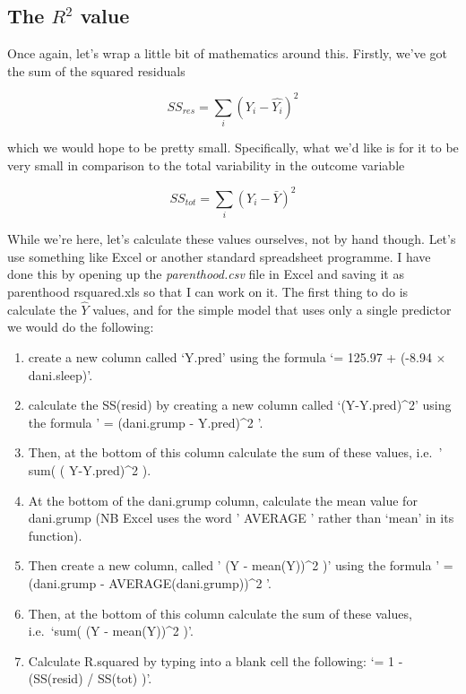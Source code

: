\documentclass[
  a4paper,
]{book}
\providecommand{\tightlist}{%
  \setlength{\itemsep}{0pt}\setlength{\parskip}{0pt}}\usepackage{longtable,booktabs,array}
\begin{document}
\hypertarget{sec-The-R2-value}{%
\subsection{\texorpdfstring{The \(R^2\)
value}{The R\^{}2 value}}\label{sec-The-R2-value}}

Once again, let's wrap a little bit of mathematics around this. Firstly,
we've got the sum of the squared residuals

\[SS_{res}=\sum_i (Y_i-\hat{Y_i})^2\]

which we would hope to be pretty small. Specifically, what we'd like is
for it to be very small in comparison to the total variability in the
outcome variable

\[SS_{tot}=\sum_i(Y_i-\bar{Y})^2\]

While we're here, let's calculate these values ourselves, not by hand
though. Let's use something like Excel or another standard spreadsheet
programme. I have done this by opening up the \emph{parenthood.csv} file
in Excel and saving it as parenthood rsquared.xls so that I can work on
it. The first thing to do is calculate the \(\hat{Y}\) values, and for
the simple model that uses only a single predictor we would do the
following:

\begin{enumerate}
\def\labelenumi{\arabic{enumi}.}
\tightlist
\item
  create a new column called `Y.pred' using the formula `= 125.97 +
  (-8.94 \(\times\) dani.sleep)'.
\item
  calculate the SS(resid) by creating a new column called
  `(Y-Y.pred)\^{}2' using the formula ' = (dani.grump - Y.pred)\^{}2 '.
\item
  Then, at the bottom of this column calculate the sum of these values,
  i.e.~' sum( ( Y-Y.pred)\^{}2 ).
\item
  At the bottom of the dani.grump column, calculate the mean value for
  dani.grump (NB Excel uses the word ' AVERAGE ' rather than `mean' in
  its function).
\item
  Then create a new column, called ' (Y - mean(Y))\^{}2 )' using the
  formula ' = (dani.grump - AVERAGE(dani.grump))\^{}2 '.
\item
  Then, at the bottom of this column calculate the sum of these values,
  i.e.~`sum( (Y - mean(Y))\^{}2 )'.
\item
  Calculate R.squared by typing into a blank cell the following: `= 1 -
  (SS(resid) / SS(tot) )'.
\end{enumerate}
\end{document}
